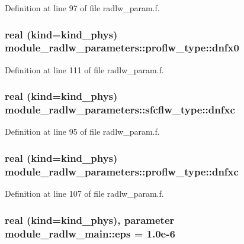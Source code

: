 Definition at line 97 of file radlw\+\_\+param.\+f.

\subsubsection[{\texorpdfstring{dnfx0}{dnfx0}}]{\setlength{\rightskip}{0pt plus 5cm}real (kind=kind\+\_\+phys) module\+\_\+radlw\+\_\+parameters\+::proflw\+\_\+type\+::dnfx0}\hypertarget{group__module__radlw__main_ga4804a215b761165846e87428b3f3c12c}{}\label{group__module__radlw__main_ga4804a215b761165846e87428b3f3c12c}


Definition at line 111 of file radlw\+\_\+param.\+f.

\subsubsection[{\texorpdfstring{dnfxc}{dnfxc}}]{\setlength{\rightskip}{0pt plus 5cm}real (kind=kind\+\_\+phys) module\+\_\+radlw\+\_\+parameters\+::sfcflw\+\_\+type\+::dnfxc}\hypertarget{group__module__radlw__main_gae65c0014042ceffec4293e4d300f9cb8}{}\label{group__module__radlw__main_gae65c0014042ceffec4293e4d300f9cb8}


Definition at line 95 of file radlw\+\_\+param.\+f.

\subsubsection[{\texorpdfstring{dnfxc}{dnfxc}}]{\setlength{\rightskip}{0pt plus 5cm}real (kind=kind\+\_\+phys) module\+\_\+radlw\+\_\+parameters\+::proflw\+\_\+type\+::dnfxc}\hypertarget{group__module__radlw__main_ga5f7ae4abe7912e8dbe371b577ba91945}{}\label{group__module__radlw__main_ga5f7ae4abe7912e8dbe371b577ba91945}


Definition at line 107 of file radlw\+\_\+param.\+f.

\subsubsection[{\texorpdfstring{eps}{eps}}]{\setlength{\rightskip}{0pt plus 5cm}real (kind=kind\+\_\+phys), parameter module\+\_\+radlw\+\_\+main\+::eps = 1.\+0e-\/6\hspace{0.3cm}{\ttfamily [private]}}\hypertarget{group__module__radlw__main_gac82309fd8d0e351ac37b276833a10376}{}\label{group__module__radlw__main_gac82309fd8d0e351ac37b276833a10376}


